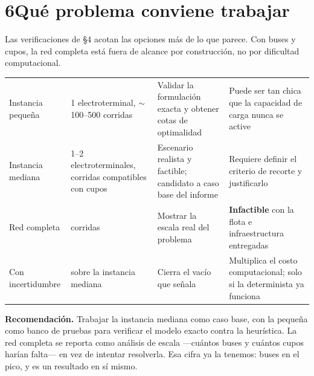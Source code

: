 \documentclass[11pt,a4paper,parskip=half]{scrartcl}
\begin{document}
\section*{6\quad Qué problema conviene trabajar}

Las verificaciones de §4 acotan las opciones más de lo que parece. Con \flotaDeclarada{} buses y \cuposTotales{} cupos, la red completa está fuera de alcance por construcción, no por dificultad computacional.

\begin{longtable}{@{}L{3.3cm}L{3.4cm}L{4.2cm}L{4.6cm}@{}}
 &  &  &  \\
\endfirsthead
\midrule
Instancia pequeña & 1 electroterminal, $\sim$100--500 corridas & Validar la formulación exacta y obtener cotas de optimalidad & Puede ser tan chica que la capacidad de carga nunca se active \\
\addlinespace
{}
Instancia mediana & 1--2 electroterminales, corridas compatibles con \cuposTotales{} cupos & Escenario realista y factible; candidato a caso base del informe & Requiere definir el criterio de recorte y justificarlo \\
\addlinespace
Red completa & \corridasReales{} corridas & Mostrar la escala real del problema & \textbf{Infactible} con la flota e infraestructura entregadas \\
\addlinespace
{}
Con incertidumbre & sobre la instancia mediana & Cierra el vacío que señala \citet{perumal_evspreview_2022} & Multiplica el costo computacional; solo si la determinista ya funciona \\
\bottomrule
\end{longtable}

\begin{nota}
\textbf{\textcolor{ink}{Recomendación.}} Trabajar la instancia mediana como caso base, con la pequeña como banco de pruebas para verificar el modelo exacto contra la heurística. La red completa se reporta como análisis de escala —cuántos buses y cuántos cupos harían falta— en vez de intentar resolverla. Esa cifra ya la tenemos: \picoSimultaneo{} buses en el pico, y es un resultado en sí mismo.
\end{nota}

\clearpage
\renewcommand{\refname}{Referencias citadas}

\end{document}
